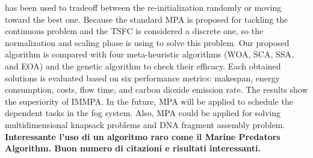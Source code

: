 has been used to tradeoff between the re-initialization randomly or
moving toward the best one. Because the standard MPA is
proposed for tackling the continuous problem and the TSFC is
considered a discrete one, so the normalization and scaling phase
is using to solve this problem. Our proposed algorithm is compared
with four meta-heuristic algorithms (WOA, SCA, SSA, and EOA)
and the genetic algorithm to check their efficacy. Each obtained
solutions is evaluated based on six performance metrics: makespan, energy consumption, costs, flow time, and carbon dioxide
emission rate. The results show the superiority of IMMPA. In the
future, MPA will be applied to schedule the dependent tasks in the
fog system. Also, MPA could be applied for solving multidimensional knapsack problems and DNA fragment assembly
problem. \\
\textbf{Interessante l'uso di un algoritmo raro come il Marine Predators Algorithm. Buon numero di citazioni e risultati interessanti.}



